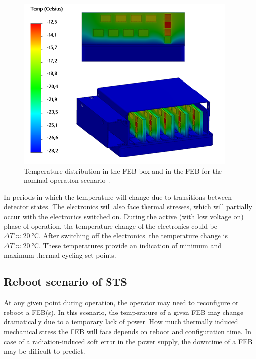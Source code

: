 \begin{figure}[!h]
\centering
\includegraphics[width=0.5\columnwidth]{Chapter4/images/nominal_febs.png}
\caption{Temperature distribution in the \gls{FEB} box and in the \gls{FEB} for the nominal operation scenario~\cite{thermal_cycling}.}
\label{fig_nominal_febs}
\end{figure}


In periods in which the temperature will change due to transitions between detector states. The electronics will also face thermal stresses, which will partially occur with the electronics switched on. During the active (with low voltage on) phase of operation, the temperature change of the electronics could be $\Delta T \approx \SI{20}{\celsius}$. After switching off the electronics, the temperature change is $\Delta T \approx \SI{20}{\celsius}$. These temperatures provide an indication of minimum and maximum thermal cycling set points.  

\subsection{Reboot scenario of STS}
\label{reboot}

At any given point during operation, the operator may need to reconfigure or reboot a \gls{FEB}(s). In this scenario, the temperature of a given \gls{FEB} may change dramatically due to a temporary lack of power. How much thermally induced mechanical stress the \gls{FEB} will face depends on reboot and configuration time. In case of a radiation-induced soft error in the power supply, the downtime of a \gls{FEB} may be difficult to predict. 

